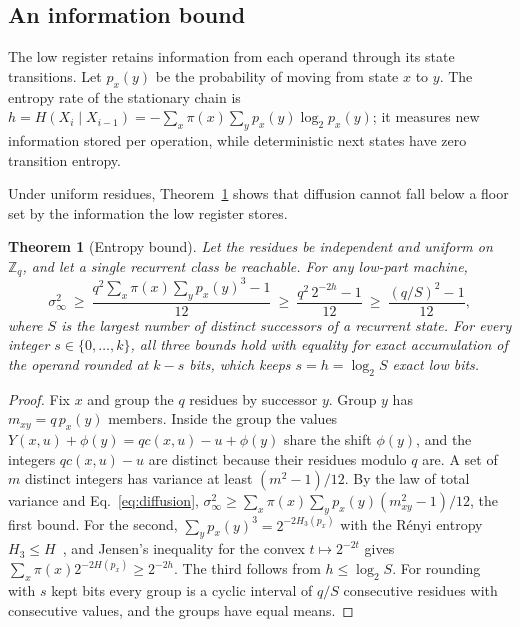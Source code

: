 \documentclass[preprint,12pt,numbers]{elsarticle}
\newcommand{\Z}{\mathbb{Z}}
\newtheorem{theorem}{Theorem}
\theoremstyle{definition}
\begin{document}
\subsection{An information bound}
\label{sec:bound}

The low register retains information from each operand through its state
transitions. Let $p_{x}(y)$ be the probability of moving from state $x$ to
$y$. The entropy rate of the stationary chain is
$h=H(X_i\mid X_{i-1})=-\sum_x\pi(x)\sum_yp_x(y)\log_2p_x(y)$; it measures
new information stored per operation, while deterministic next states
have zero transition entropy.

Under uniform residues, Theorem~\ref{thm:bound} shows that diffusion
cannot fall below a floor set by the information the low register stores.
\begin{theorem}[Entropy bound]\label{thm:bound}
Let the residues be independent and uniform on $\Z_q$, and let a single
recurrent class be reachable. For any low-part machine,
\begin{equation}
\sigma^2_\infty\ \ge\ \frac{q^2\sum_x\pi(x)\sum_yp_x(y)^3-1}{12}
\ \ge\ \frac{q^2\,2^{-2h}-1}{12}
\ \ge\ \frac{(q/S)^2-1}{12},
\label{eq:bound}
\end{equation}
where $S$ is the largest number of distinct successors of a recurrent state.
For every integer $s\in\{0,\ldots,k\}$, all three bounds hold with equality
for exact accumulation of the operand rounded at $k-s$ bits, which keeps
$s=h=\log_2S$ exact low bits.
\end{theorem}
\begin{proof}
Fix $x$ and group the $q$ residues by successor $y$. Group $y$ has
$m_{xy}=q\,p_x(y)$ members. Inside the group the values
$Y(x,u)+\phi(y)=qc(x,u)-u+\phi(y)$ share the shift $\phi(y)$, and the integers
$qc(x,u)-u$ are distinct because their residues modulo $q$ are. A set of $m$
distinct integers has variance at least $(m^2-1)/12$. By the law of total
variance and Eq.~\eqref{eq:diffusion},
$\sigma^2_\infty\ge\sum_x\pi(x)\sum_yp_x(y)(m_{xy}^2-1)/12$, the first bound.
For the second, $\sum_yp_x(y)^3=2^{-2H_3(p_x)}$ with the R\'enyi entropy
$H_3\le H$~\cite{renyi1961}, and Jensen's inequality for the convex
$t\mapsto2^{-2t}$ gives $\sum_x\pi(x)2^{-2H(p_x)}\ge2^{-2h}$. The third
follows from $h\le\log_2S$. For rounding with $s$ kept bits every group is a
cyclic interval of $q/S$ consecutive residues with consecutive values, and
the groups have equal means.
\end{proof}
\end{document}
